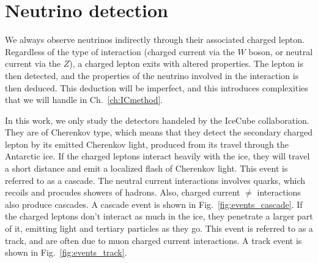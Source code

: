 % 
% 
\section{Neutrino detection}
We always observe neutrinos indirectly through their associated charged lepton. 
Regardless of the type of interaction (charged current via the $W$ boson, or neutral current
via the $Z$), a charged lepton exits with altered properties. The lepton is then detected, and the properties of the neutrino involved in the 
interaction is then deduced. This deduction will be imperfect, and this introduces complexities that we will handle in Ch.~\ref{ch:ICmethod}. 

In this work, we only study the detectors handeled by the IceCube collaboration. They are of Cherenkov type, which means that they detect 
the secondary charged lepton by its emitted Cherenkov light, produced from its travel through the Antarctic ice. 
If the charged leptons interact heavily with the ice, they will travel a short distance and emit a localized flash of 
Cherenkov light. This event is referred to as a cascade. The neutral current interactions involves quarks, which recoils and procudes
showers of hadrons. Also, charged current $\ne$ interactions also produce cascades. A cascade event 
is shown in Fig.~\ref{fig:events_cascade}.
If the charged leptons don't interact as much in the ice, they penetrate a larger part of it, emitting light and tertiary particles
as they go. This event is referred to as a track, and are often due to muon charged current interactions. A track event 
is shown in Fig.~\ref{fig:events_track}.

